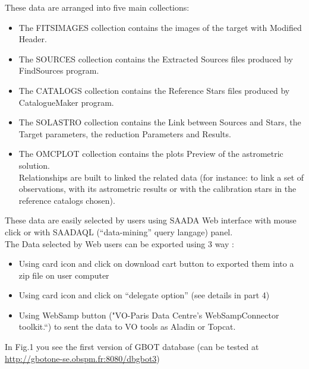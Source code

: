 \noindent These data are arranged into five main collections: 

\begin{itemize}
\item The FITSIMAGES collection contains the images of the target with Modified Header.
\item The SOURCES collection contains the Extracted Sources files produced by FindSources program.
\item The CATALOGS collection contains the Reference Stars files produced by CatalogueMaker program.
\item The SOLASTRO collection contains the Link between Sources and Stars, the Target parameters, the reduction Parameters and Results.
\item The OMCPLOT collection contains the plots Preview of the astrometric solution.\\
Relationships are built to linked the related data (for instance: to link a set of observations, with its astrometric results or with the calibration stars in the reference catalogs chosen).
\end{itemize}

These data are easily selected by users using SAADA Web interface with mouse click or with SAADAQL (“data-mining” query langage) panel. \\
The Data selected by Web users can be exported using 3 way :\\
\begin{itemize}
\item Using card icon and click on download cart button to exported them into a zip file on user computer
\item Using card icon and click on “delegate option” (see details in part 4)
\item Using WebSamp button ("VO-Paris Data Centre's WebSampConnector toolkit.“) to sent the data to VO tools as Aladin or Topcat.
\end{itemize}
\hspace*{0.25cm}In Fig.1 you see the  first version of GBOT database (can be tested at \url{http://gbotone-se.obspm.fr:8080/dbgbot3})

